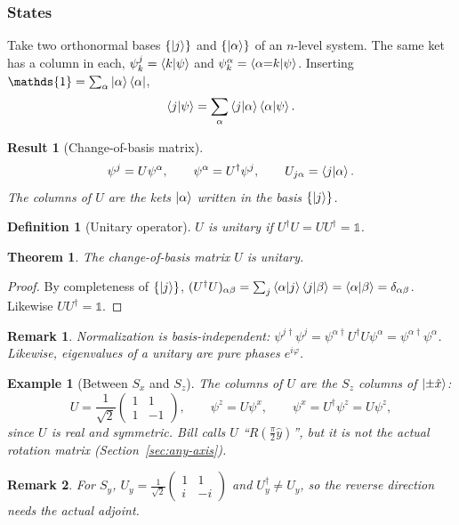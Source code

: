 \documentclass{article}
\newtheorem{theorem}{Theorem}
\newtheorem{definition}{Definition}
\newtheorem*{example}{Example}
\newtheorem{remark}{Remark}
\newtheorem{result}{Result}
\newcommand{\id}{\mathds{1}}
\begin{document}
\subsubsection{States}
Take two orthonormal bases $\{\ket{j}\}$ and $\{\ket{\alpha}\}$ of an $n$-level system. The same ket has a column in each, $\psi^j_k = \braket{k|\psi}$ and $\psi^\alpha_k = \braket{\alpha{=}k|\psi}$. Inserting $\id = \sum_\alpha\ket{\alpha}\bra{\alpha}$,
\[\braket{j|\psi} = \sum_{\alpha}\braket{j|\alpha}\braket{\alpha|\psi}.\]
\begin{result}[Change-of-basis matrix]
    \begin{equation}
        \psi^{j} = U\psi^{\alpha}, \qquad \psi^{\alpha} = U^\dagger\psi^{j}, \qquad U_{j\alpha} = \braket{j|\alpha}.
    \end{equation}
    The columns of $U$ are the kets $\ket{\alpha}$ written in the basis $\{\ket{j}\}$.
\end{result}
\begin{definition}[Unitary operator]
    $U$ is unitary if $U^\dagger U = UU^\dagger = \id$.
\end{definition}
\begin{theorem}
    The change-of-basis matrix $U$ is unitary.
\end{theorem}
\begin{proof}
    By completeness of $\{\ket{j}\}$, $(U^\dagger U)_{\alpha\beta} = \sum_j\braket{\alpha|j}\braket{j|\beta} = \braket{\alpha|\beta} = \delta_{\alpha\beta}$. Likewise $UU^\dagger = \id$.
\end{proof}
\begin{remark}
    Normalization is basis-independent: $\psi^{j\dagger}\psi^{j} = \psi^{\alpha\dagger}U^\dagger U\psi^{\alpha} = \psi^{\alpha\dagger}\psi^{\alpha}$. Likewise, eigenvalues of a unitary are pure phases $e^{i\varphi}$.
\end{remark}
\begin{example}[Between $S_x$ and $S_z$]
    The columns of $U$ are the $S_z$ columns of $\ket{\pm\hat{x}}$:
    \begin{equation}
        \label{eq:Uzx}
        U = \frac{1}{\sqrt{2}}\begin{pmatrix} 1 & 1 \\ 1 & -1 \end{pmatrix}, \qquad \psi^z = U\psi^x, \qquad \psi^x = U^\dagger\psi^z = U\psi^z,
    \end{equation}
    since $U$ is real and symmetric. Bill calls $U$ ``$R\left(\tfrac{\pi}{2}\hat{y}\right)$'', but it is not the actual rotation matrix (Section~\ref{sec:any-axis}).
\end{example}
\begin{remark}
    For $S_y$, $U_y = \frac{1}{\sqrt{2}}\begin{pmatrix} 1 & 1 \\ i & -i \end{pmatrix}$ and $U_y^\dagger \neq U_y$, so the reverse direction needs the actual adjoint.
\end{remark}
\end{document}
